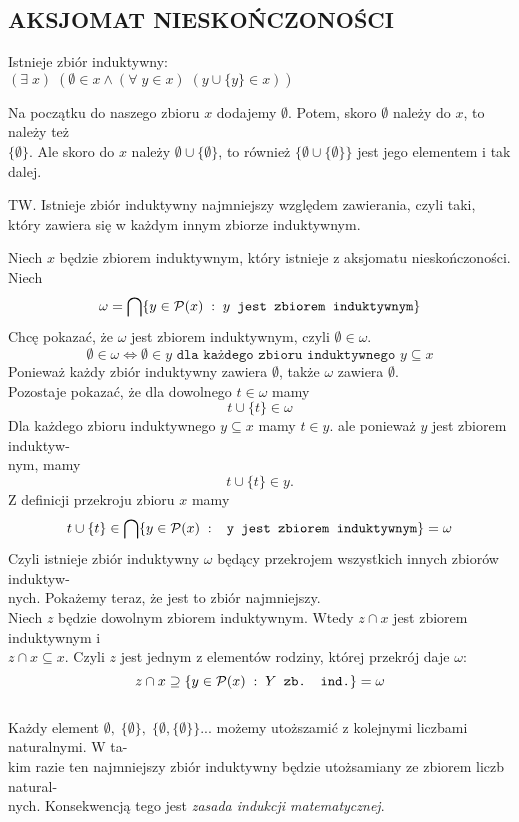 \subsection{AKSJOMAT NIESKOŃCZONOŚCI}
\begin{center}\large
    Istnieje {\color{emp}zbiór induktywny}:\smallskip\\
    $(\exists\;x)\;(\emptyset\in x\land (\forall\;y\in x)\;(y\cup\{y\}\in x))$
\end{center}
Na początku do naszego zbioru $x$ dodajemy $\emptyset$. Potem, skoro $\emptyset$ należy do $x$, to należy też \\$\{\emptyset\}$. Ale skoro do $x$ należy $\emptyset\cup\{\emptyset\}$, to również $\{\emptyset\cup\{\emptyset\}\}$ jest jego elementem i tak dalej.\bigskip\\
\bigskip
\begin{center}\large
    {\color{def}TW.} Istnieje zbiór induktywny najmniejszy względem zawierania, czyli taki, który zawiera się w każdym innym zbiorze induktywnym.
\end{center}\bigskip
\dowod
Niech $x$ będzie zbiorem induktywnym, który istnieje z aksjomatu nieskończoności. Niech
$$\omega=\bigcap\{y\in\mathcal{P}(x)\;:\;y \texttt{ jest zbiorem induktywnym}\}$$
Chcę pokazać, że $\omega$ jest zbiorem induktywnym, czyli $\emptyset\in\omega$.
$$\emptyset\in\omega\iff\emptyset\in y \texttt{ dla każdego zbioru induktywnego }y\subseteq x$$
Ponieważ każdy zbiór induktywny zawiera $\emptyset$, także $\omega$ zawiera $\emptyset$.\medskip\\
Pozostaje pokazać, że dla dowolnego $t\in\omega$ mamy
$$t\cup\{t\}\in \omega$$
Dla każdego zbioru induktywnego $y\subseteq x$ mamy $t\in y$. ale ponieważ $y$ jest zbiorem induktyw-\\nym, mamy 
$$t\cup\{t\}\in y.$$
Z definicji przekroju zbioru $x$ mamy
$$t\cup\{t\}\in \bigcap \{y\in \mathcal{P}(x)\;:\;\texttt{ y jest zbiorem induktywnym}\}=\omega$$
Czyli istnieje zbiór induktywny $\omega$ będący przekrojem wszystkich innych zbiorów induktyw-\\nych. Pokażemy teraz, że jest to zbiór najmniejszy.\medskip\\
Niech $z$ będzie dowolnym zbiorem induktywnym. Wtedy $z\cap x$ jest zbiorem induktywnym i \\$z\cap x\subseteq x$. Czyli $z$ jest jednym z elementów rodziny, której przekrój daje $\omega$:
$$z\cap x\supseteq \{y\in\mathcal{P}(x)\;:\; Y\texttt{ zb. ind.}\}=\omega$$
\kondow
{}\bigskip\\
Każdy element $\emptyset,\;\{\emptyset\},\;\{\emptyset,\{\emptyset\}\}...$ możemy utoższamić z {\color{acc}kolejnymi liczbami naturalnymi}. W ta-\\kim razie ten najmniejszy zbiór induktywny będzie utożsamiany ze zbiorem liczb natural-\\nych. Konsekwencją tego jest \emph{\color{emp}zasada indukcji matematycznej}.\smallskip\\
